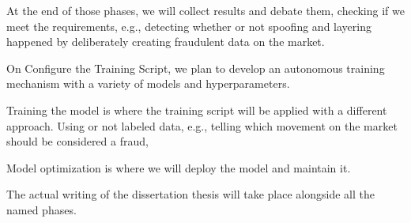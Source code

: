 At the end of those phases, we will collect results and debate them, checking if we meet the requirements, e.g.,
detecting whether or not spoofing and layering happened by deliberately creating fraudulent data on the market.

On Configure the Training Script, we plan to develop an autonomous training mechanism with a variety of models and
hyperparameters.

Training the model is where the training script will be applied with a different approach. Using or not labeled data,
e.g., telling which movement on the market should be considered a fraud,

Model optimization is where we will deploy the model and maintain it.

The actual writing of the dissertation thesis will take place alongside all the named phases.